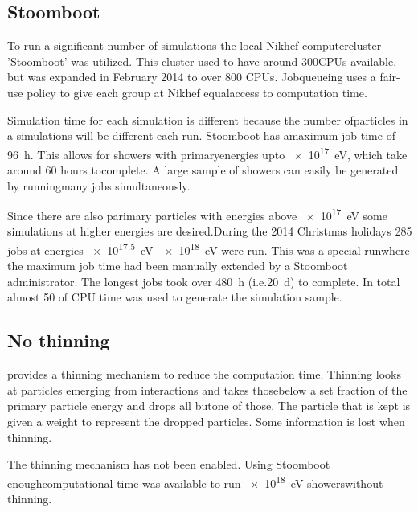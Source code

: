 \subsection{Stoomboot}

To run a significant number of simulations the local Nikhef computercluster 'Stoomboot' was utilized. This cluster used to have around 300CPUs available, but was expanded in February 2014 to over 800 CPUs. Jobqueueing uses a fair-use policy to give each group at Nikhef equalaccess to computation time.

Simulation time for each simulation is different because the number ofparticles in a simulations will be different each run. Stoomboot has amaximum job time of \SI{96}{\hour}. This allows for showers with primaryenergies upto \SI{e17}{\eV}, which take around 60 hours tocomplete. A large sample of showers can easily be generated by runningmany jobs simultaneously.

Since there are also parimary particles with energies above \SI{e17}{\eV} some simulations at higher energies are desired.During the 2014 Christmas holidays 285 jobs at energies \SIrange{e17.5}{e18}{\eV} were run. This was a special runwhere the maximum job time had been manually extended by a Stoomboot administrator. The longest jobs took over \SI{480}{\hour} (i.e.\SI{20}{\day}) to complete. In total almost \SI{50}{\year} of CPU time was used to generate the simulation sample.

\begin{figure}
    \centering
    
    \caption{}
    \label{fig:simulations_shower_walltime}
\end{figure}


\subsection{No thinning}

\corsika provides a thinning mechanism to reduce the computation time. Thinning looks at particles emerging from interactions and takes thosebelow a set fraction of the primary particle energy and drops all butone of those. The particle that is kept is given a weight to represent the dropped particles. Some information is lost when thinning.

The thinning mechanism has not been enabled. Using Stoomboot enoughcomputational time was available to run \SI{e18}{\eV} showerswithout thinning.

